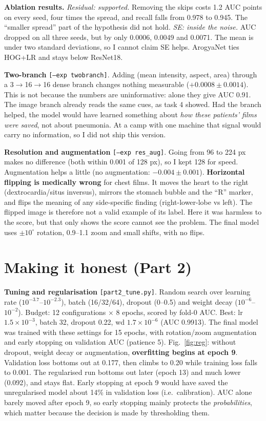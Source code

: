 \documentclass[10pt,a4paper]{article}
\newcommand{\src}[1]{{\footnotesize\texttt{[#1]}}}
\begin{document}
\vspace{4pt}
\textbf{Ablation results.} \emph{Residual: supported.} Removing the skips costs 1.2 AUC points on every seed, four times the spread, and recall falls from 0.978 to 0.945.
The ``smaller spread'' part of the hypothesis did not hold. \emph{SE: inside the noise.} AUC dropped on all three seeds, but by only 0.0006, 0.0049 and 0.0071. The mean
is under two standard deviations, so I cannot claim SE helps. ArogyaNet ties HOG+LR and stays below ResNet18.

\textbf{Two-branch} \src{--exp twobranch}. Adding (mean intensity, aspect, area) through a 3$\to$16$\to$16 dense branch changes nothing measurable ($+0.0008\pm0.0014$).
This is not because the numbers are uninformative: alone they give AUC 0.91. The image branch already reads the same cues, as task 4 showed.
Had the branch helped, the model would have learned something about \emph{how these patients' films were saved}, not about pneumonia.
At a camp with one machine that signal would carry no information, so I did not ship this version.

\textbf{Resolution and augmentation} \src{--exp res\_aug}. Going from 96 to 224 px makes no difference (both within 0.001 of 128 px), so I kept 128 for speed.
Augmentation helps a little (no augmentation: $-0.004\pm0.001$). \textbf{Horizontal flipping is medically wrong} for chest films. It moves the heart to the right
(dextrocardia/situs inversus), mirrors the stomach bubble and the ``R'' marker, and flips the meaning of any side-specific finding (right-lower-lobe vs left).
The flipped image is therefore not a valid example of its label. Here it was harmless to the score, but that only shows the score cannot see the problem.
The final model uses $\pm10^\circ$ rotation, 0.9--1.1 zoom and small shifts, with no flips.

\section{Making it honest (Part 2)}

\textbf{Tuning and regularisation} \src{part2\_tune.py}. Random search over learning rate ($10^{-3.7}$--$10^{-2.3}$), batch (16/32/64), dropout (0--0.5)
and weight decay ($10^{-6}$--$10^{-2}$). Budget: 12 configurations $\times$ 8 epochs, scored by fold-0 AUC. Best: lr $1.5\times10^{-3}$, batch 32, dropout 0.22,
wd $1.7\times10^{-6}$ (AUC 0.9913). The final model was trained with these settings for 15 epochs, with rotation/zoom augmentation and early stopping on validation AUC (patience 5).
Fig.~\ref{fig:reg}: without dropout, weight decay or augmentation, \textbf{overfitting begins at epoch 9}. Validation loss bottoms out at 0.177, then climbs to 0.20 while training loss falls to 0.001.
The regularised run bottoms out later (epoch 13) and much lower (0.092), and stays flat. Early stopping at epoch 9 would have saved the unregularised model about 14\% in validation loss
(i.e.\ calibration). AUC alone barely moved after epoch 9, so early stopping mainly protects the \emph{probabilities}, which matter because the decision is made by thresholding them.
\end{document}
